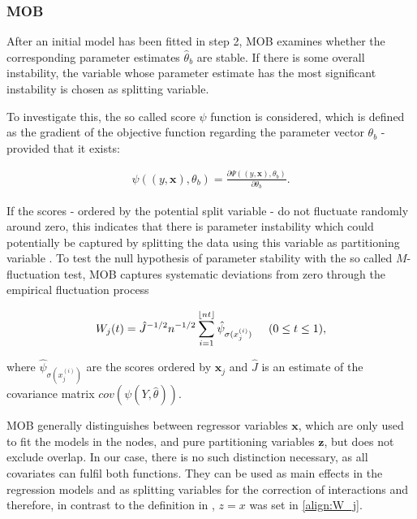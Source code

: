 \subsubsection{MOB}
After an initial model has been fitted in step 2, MOB examines whether the corresponding parameter estimates $\hat{\theta}_b$ are stable. If there is some overall instability, the variable whose parameter estimate has the most significant instability is chosen as splitting variable.

To investigate this, the so called score $\psi$ function is considered, which is defined as the
gradient of the objective function regarding the parameter vector $\theta_b$ - provided that it exists:

\begin{align}
    \psi \left( \left(y, \mathbf{x} \right), \theta_b \right) = \frac{\partial \Psi\left( \left(y, \mathbf{x} \right), \theta_b \right)}{\partial \theta_b}.
\end{align}

\citep{Zeileis.2008}

If the scores - ordered by the potential split variable - do not fluctuate randomly around zero, this indicates that there is parameter instability which could potentially be captured by splitting the data using this variable as partitioning variable \citep{Schlosser.2019}.
To test the null hypothesis of parameter stability with the so called $M$-fluctuation test, MOB captures systematic deviations from zero through the empirical fluctuation process

\begin{align}\label{align:W_j}
    W_{j}(t) = \hat{J}^{-1/2}n^{-1/2}\sum_{i = 1}^{\lfloor nt \rfloor} \hat{\psi}_{\sigma(x_{j}^{(i)})} \hspace{0.5cm} (0 \leq t \leq 1), 
\end{align}

where $\hat{\psi}_{\sigma(x_{j}^{(i)})}$ are the scores ordered by $\mathbf{x}_{j}$ and $\hat{J}$ is an estimate of the covariance matrix $cov(\psi(Y, \hat{\theta}))$. \citep{Zeileis.2008}

MOB generally distinguishes between regressor variables $\mathbf{x}$, which are only used to fit the models in the nodes, and pure partitioning variables $\mathbf{z}$, but does not exclude overlap. In our case, there is no such distinction necessary, as all covariates can fulfil both functions.  They can be used as main effects in the regression models and as splitting variables for the correction of interactions and therefore, in contrast to the definition in \citep{Zeileis.2008}, $z = x$ was set in \ref{align:W_j}.



